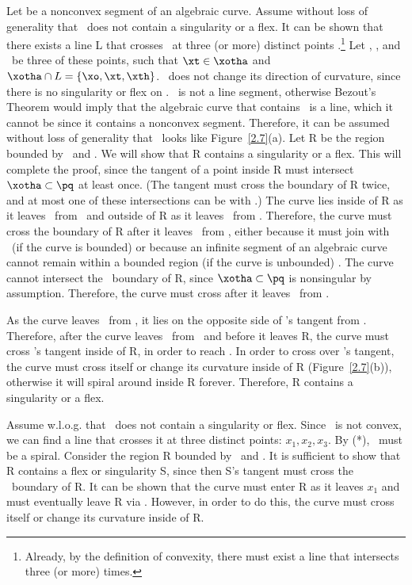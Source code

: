 Let  be a nonconvex segment of an algebraic curve.
Assume without loss of generality that \pq\ does not contain a singularity or 
a flex.
It can be shown that there exists a line L that crosses \pq\ at three 
(or more) distinct points \cite[p. 117]{jj}.\footnote{Already, by the definition
	of convexity, there must exist a line that intersects  three
	(or more) times.}
Let \xo, \xt, and \xth\ be three of these points, such that $\xt \in \xotha$ 
and \mbox{$\xotha \cap L = \{ \xo,\xt,\xth\}$}.
\xotha\ does not change its direction of curvature, since there is no 
singularity or flex on \pq.
\xotha\ is not a line segment, otherwise Bezout's Theorem would imply that
the algebraic curve that contains \xotha\ is a line, which it cannot be since
it contains a nonconvex segment.
Therefore, it can be assumed without loss of generality that \xotha\ looks like 
Figure~\ref{2.7}(a).
Let R be the region bounded by \xotha\ and \seg{\xo\xth}.
We will show that R contains a singularity or a flex.
This will complete the proof, since the tangent
of a point inside R must intersect $\xotha \subset \pq$ at least once.
(The tangent must cross the boundary of R twice, and at most one of these
intersections can be with 
\seg{\xo\xth}.)
The curve lies inside of R as it leaves \xotha\ from \xo\ and outside 
of R as it leaves \xotha\ from \xth.
Therefore, the curve must cross the boundary of R after it leaves \xotha\
from \xo, either because it must join with \xth\ (if the curve is bounded)
or because an infinite segment of an algebraic curve
cannot remain within a bounded region (if the curve is unbounded) \cite[p. 116]{jj}.
The curve cannot intersect the \xotha\ boundary of R, since
\mbox{$\xotha \subset \pq$} is nonsingular by assumption.
Therefore, the curve must cross \seg{\xo\xth} after it leaves
\xotha\ from \xo.

As the curve leaves \xotha\ from \xo,
it lies on the opposite side of \xo's tangent from \seg{\xo\xth}.
Therefore, after the curve leaves \xotha\ from \xo\ and before it leaves
R, the curve must cross \xo's tangent inside of R, in order to reach 
\seg{\xo\xth}.
In order to cross over \xo's tangent, the curve
must cross itself or change its curvature inside of R (Figure~\ref{2.7}(b)),
otherwise it will spiral around inside R forever.
Therefore, R contains a singularity or a flex.
\QED
\else
{}

Assume w.l.o.g. that \ does
\marginpar{(*)}
not contain a singularity or flex.
Since \ is not convex, we can find a line that crosses it at
three distinct points: $x_{1}, x_{2}, x_{3}$.
By (*), \ must be a spiral.
Consider the region R bounded by \ and .
It is sufficient to show that R contains a flex or singularity S,
since then S's tangent must cross the \arc{x_{1}x_{3}}\ boundary of R.
It can be shown that the curve must enter R as it leaves $x_{1}$ and
must eventually leave R via \seg{x_{1}x_{3}}.
However, in order to do this, the curve must cross itself or change its
curvature inside of R.
\QED
\fi

